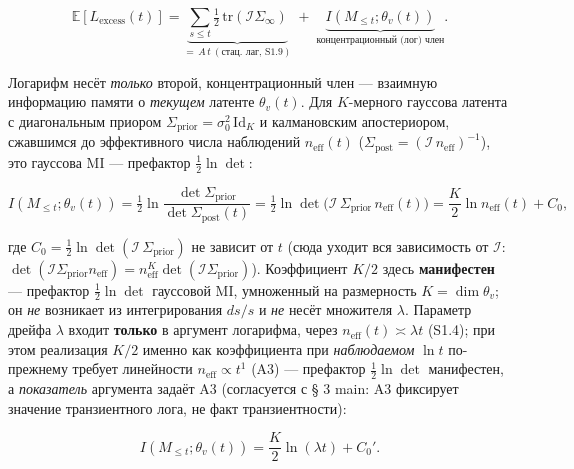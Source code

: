 \documentclass[12pt]{iopart}
\begin{document}
\begin{equation}\mathbb{E}[L_{\text{excess}}(t)] = \underbrace{\sum_{s\le t}\tfrac12\,\mathrm{tr}(\mathcal I\Sigma_\infty)}_{=\,A\,t\ (\text{стац. лаг, S1.9})} \;+\; \underbrace{I(M_{\le t};\theta_v(t))}_{\text{концентрационный (лог) член}}. \tag{S1.6a}\end{equation}



Логарифм несёт \emph{только} второй, концентрационный член --- взаимную информацию памяти о \emph{текущем} латенте \(\theta_v(t)\). Для \(K\)-мерного гауссова латента с диагональным приором \(\Sigma_{\text{prior}}=\sigma_0^2\,\mathrm{Id}_K\) и калмановским апостериором, сжавшимся до эффективного числа наблюдений \(n_{\text{eff}}(t)\) (\(\Sigma_{\text{post}}=(\mathcal I\,n_{\text{eff}})^{-1}\)), это гауссова MI --- префактор \(\tfrac12\ln\det\):



\begin{equation}I(M_{\le t};\theta_v(t)) = \tfrac12\ln\frac{\det\Sigma_{\text{prior}}}{\det\Sigma_{\text{post}}(t)} = \tfrac12\ln\det\!\big(\mathcal I\,\Sigma_{\text{prior}}\,n_{\text{eff}}(t)\big) = \frac{K}{2}\ln n_{\text{eff}}(t) + C_0, \tag{S1.6b}\end{equation}



где \(C_0=\tfrac12\ln\det(\mathcal I\,\Sigma_{\text{prior}})\) не зависит от \(t\) (сюда уходит вся зависимость от \(\mathcal I\): \(\det(\mathcal I\Sigma_{\text{prior}}n_{\text{eff}})=n_{\text{eff}}^K\det(\mathcal I\Sigma_{\text{prior}})\)). Коэффициент \(K/2\) здесь \textbf{манифестен} --- префактор \(\tfrac12\ln\det\) гауссовой MI, умноженный на размерность \(K=\dim\theta_v\); он \emph{не} возникает из интегрирования \(ds/s\) и \emph{не} несёт множителя \(\lambda\). Параметр дрейфа \(\lambda\) входит \textbf{только} в аргумент логарифма, через \(n_{\text{eff}}(t)\asymp\lambda t\) (S1.4); при этом реализация \(K/2\) именно как коэффициента при \emph{наблюдаемом} \(\ln t\) по-прежнему требует линейности \(n_{\text{eff}}\propto t^1\) (A3) --- префактор \(\tfrac12\ln\det\) манифестен, а \emph{показатель} аргумента задаёт A3 (согласуется с § 3 main: A3 фиксирует значение транзиентного лога, не факт транзиентности):



\begin{equation}I(M_{\le t};\theta_v(t)) = \frac{K}{2}\ln(\lambda t) + C_0'. \tag{S1.6c}\end{equation}
\end{document}
